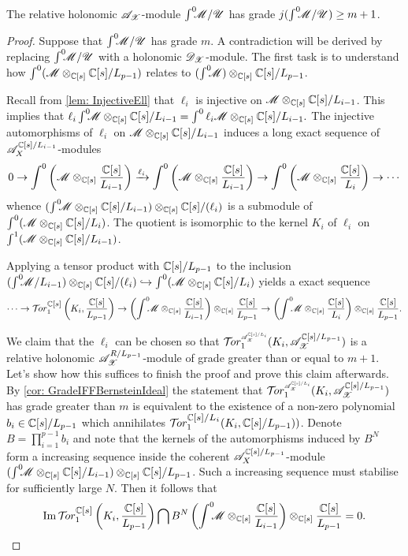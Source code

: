 \begin{lemma}\label{lem: GradeNPlusOne}
  The relative holonomic $\mathscr{A}_{\mathscr{X}}$-module $\int^0 \mkern -8mu\mathscr{M}/\mathscr{U}$ has grade $j(\int^0 \mkern -8mu\mathscr{M}/\mathscr{U})\geq m+1$.
\end{lemma}
\begin{proof}
  Suppose that $\int^0 \mkern -8mu\mathscr{M}/\mathscr{U}$ has grade $m$.
  A contradiction will be derived by replacing $\int^0 \mkern -8mu\mathscr{M}/\mathscr{U}$ with a holonomic $\mathscr{D}_{\mathscr{X}}$-module.
  The first task is to understand how $\int^0(\mathscr{M}\otimes_{\mathbb{C}[s]}\mathbb{C}[s]/L_{p-1})$ relates to $(\int^0 \mkern -8mu\mathscr{M})\otimes_{\mathbb{C}[s]}\mathbb{C}[s]/L_{p-1}$.

  Recall from \cref{lem: InjectiveEll} that $\ell_{i}$ is injective on $\mathscr{M} \otimes_{\mathbb{C}[s]} \mathbb{C}[s]/L_{i-1}$. This implies that
  $\ell_{i}\int^0 \mkern -8mu \mathscr{M} \otimes_{\mathbb{C}[s]} \mathbb{C}[s]/L_{i-1} = \int^0 \ell_{i}\mathscr{M}\otimes_{\mathbb{C}[s]} \mathbb{C}[s]/L_{i-1}.$
  The injective automorphisms of $\ell_i$ on $\mathscr{M} \otimes_{\mathbb{C}[s]} \mathbb{C}[s]/L_{i-1}$ induces a long exact sequence of $\mathscr{A}_X^{\mathbb{C}[s]/L_{i-1}}$-modules
  $$0 \to \int^0\left(\mathscr{M} \otimes_{\mathbb{C}[s]} \frac{\mathbb{C}[s]}{L_{i-1}}\right) \xrightarrow{\ell_i} \int^0 \left(\mathscr{M} \otimes_{\mathbb{C}[s]} \frac{\mathbb{C}[s]}{L_{i-1}}\right) \to \int^0\left(\mathscr{M} \otimes_{\mathbb{C}[s]} \frac{\mathbb{C}[s]}{L_{i}}\right) \to \cdots $$
  whence $(\int^0 \mkern -8mu \mathscr{M}\otimes_{\mathbb{C}[s]} \mathbb{C}[s]/L_{i-1})\otimes_{\mathbb{C}[s]} \mathbb{C}[s]/(\ell_{i})$ is a submodule of $\int^0(\mathscr{M} \otimes_{\mathbb{C}[s]} \mathbb{C}[s]/L_{i})$.
  The quotient is isomorphic to the kernel $K_i$ of $\ell_i$ on $\int^1(\mathscr{M} \otimes_{\mathbb{C}[s]} \mathbb{C}[s]/L_{i-1})$.


  Applying a tensor product with $\mathbb{C}[s]/L_{p-1}$ to the inclusion $(\int^0 \mkern -8mu \mathscr{M}/L_{i-1}) \otimes_{\mathbb{C}[s]}\mathbb{C}[s]/(\ell_i)\hookrightarrow \int^0(\mathscr{M}\otimes_{\mathbb{C}[s]}\mathbb{C}[s]/L_i)$ yields a exact sequence
  $$\cdots \to \Tr{\C[s]}{1}\left(K_i, \frac{\C[s]}{L_{p-1}}\right) \to \left(\Int \M\otimes_{\C[s]}\frac{\C[s]}{L_{i-1}}\right) \otimes_{\C[s]}\frac{\C[s]}{L_{p-1}} \to \left(\Int\M\otimes_{\C[s]}\frac{\C[s]}{L_i}\right)\otimes_{\C[s]}\frac{\C[s]}{L_{p-1}}.$$

  We claim that the $\ell_i$ can be chosen so that $\Tr{\A_\X^{\C[s]/L_i} }{1}(K_i, \A_\X^{\C[s]/L_{p-1}})$ is a relative holonomic $\mathscr{A}_{\mathscr{X}}^{R/L_{p-1}}$-module of grade greater than or equal to $m+1$.
  Let's show how this suffices to finish the proof and prove this claim afterwards. \\

  By \cref{cor: GradeIFFBernsteinIdeal} the statement that $\Tr{\A_\X^{\C[s]/L_i} }{1}(K_i, \A_\X^{\C[s]/L_{p-1}})$ has grade greater than $m$ is equivalent to the existence of a non-zero polynomial $b_i\in \mathbb{C}[s]/L_{p-1}$ which annihilates $\Tr{\C[s]/L_{i}}{1}(K_i, \C[s]/L_{p-1} ))$.
  Denote $B = \prod_{i=1}^{p-1}b_i$ and note that the kernels of the automorphisms induced by $B^N$ form a increasing sequence inside the coherent $\mathscr{A}_X^{\mathbb{C}[s]/L_{p-1}}$-module $(\int^0 \mkern -8mu \mathscr{M}\otimes_{\mathbb{C}[s]}\mathbb{C}[s]/L_{i-1})\otimes_{\mathbb{C}[s]}\mathbb{C}[s]/L_{p-1}$.
  Such a increasing sequence must stabilise for sufficiently large $N$.
  Then it follows that
  $$\img \Tr{\C[s]}{1}\left(K_i, \frac{\C[s]}{L_{p-1}}\right)\bigcap B^N\left(\Int \M\otimes_{\C[s]}\frac{\C[s]}{L_{i-1}}\right)\otimes_{\C[s]}\frac{\C[s]}{L_{p-1}} = 0.$$



\end{proof}
